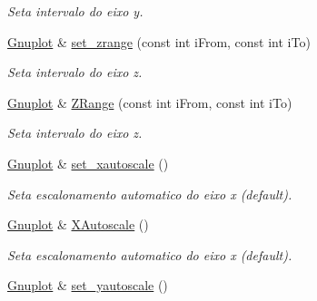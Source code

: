 \begin{DoxyCompactItemize}
\begin{DoxyCompactList}\small\item\em Seta intervalo do eixo y. \end{DoxyCompactList}\item 
\hypertarget{classGnuplot_a91666451b8cfd1c5b279d2e585b11af6}{\hyperlink{classGnuplot}{Gnuplot} \& \hyperlink{classGnuplot_a91666451b8cfd1c5b279d2e585b11af6}{set\-\_\-zrange} (const int i\-From, const int i\-To)}\label{classGnuplot_a91666451b8cfd1c5b279d2e585b11af6}

\begin{DoxyCompactList}\small\item\em Seta intervalo do eixo z. \end{DoxyCompactList}\item 
\hypertarget{classGnuplot_a8331c7ee5d65be5f4d88922a0b2f5d35}{\hyperlink{classGnuplot}{Gnuplot} \& \hyperlink{classGnuplot_a8331c7ee5d65be5f4d88922a0b2f5d35}{Z\-Range} (const int i\-From, const int i\-To)}\label{classGnuplot_a8331c7ee5d65be5f4d88922a0b2f5d35}

\begin{DoxyCompactList}\small\item\em Seta intervalo do eixo z. \end{DoxyCompactList}\item 
\hypertarget{classGnuplot_a453688dc2eb979f842082290f3c02ac3}{\hyperlink{classGnuplot}{Gnuplot} \& \hyperlink{classGnuplot_a453688dc2eb979f842082290f3c02ac3}{set\-\_\-xautoscale} ()}\label{classGnuplot_a453688dc2eb979f842082290f3c02ac3}

\begin{DoxyCompactList}\small\item\em Seta escalonamento automatico do eixo x (default). \end{DoxyCompactList}\item 
\hypertarget{classGnuplot_a4260baaa8fa1c269dd6eec31dcada605}{\hyperlink{classGnuplot}{Gnuplot} \& \hyperlink{classGnuplot_a4260baaa8fa1c269dd6eec31dcada605}{X\-Autoscale} ()}\label{classGnuplot_a4260baaa8fa1c269dd6eec31dcada605}

\begin{DoxyCompactList}\small\item\em Seta escalonamento automatico do eixo x (default). \end{DoxyCompactList}\item 
\hypertarget{classGnuplot_a3cc19dba32bb2d3ac59494ae1493faa7}{\hyperlink{classGnuplot}{Gnuplot} \& \hyperlink{classGnuplot_a3cc19dba32bb2d3ac59494ae1493faa7}{set\-\_\-yautoscale} ()}\label{classGnuplot_a3cc19dba32bb2d3ac59494ae1493faa7}


\end{DoxyCompactItemize}
